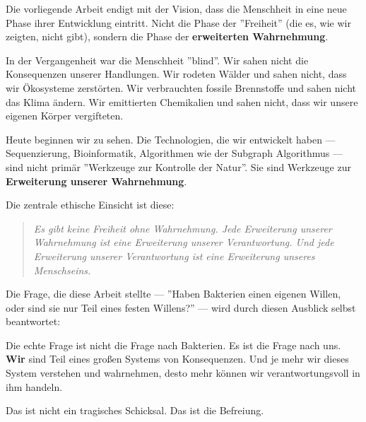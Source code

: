 \documentclass[a4paper,12pt]{article}
\theoremstyle{definition}
\begin{document}
Die vorliegende Arbeit endigt mit der Vision, dass die Menschheit in eine neue Phase ihrer Entwicklung eintritt. Nicht die Phase der ''Freiheit'' (die es, wie wir zeigten, nicht gibt), sondern die Phase der \textbf{erweiterten Wahrnehmung}.

In der Vergangenheit war die Menschheit ''blind''. Wir sahen nicht die Konsequenzen unserer Handlungen. Wir rodeten Wälder und sahen nicht, dass wir Ökosysteme zerstörten. Wir verbrauchten fossile Brennstoffe und sahen nicht das Klima ändern. Wir emittierten Chemikalien und sahen nicht, dass wir unsere eigenen Körper vergifteten.

Heute beginnen wir zu sehen. Die Technologien, die wir entwickelt haben --- Sequenzierung, Bioinformatik, Algorithmen wie der Subgraph Algorithmus --- sind nicht primär ''Werkzeuge zur Kontrolle der Natur''. Sie sind Werkzeuge zur \textbf{Erweiterung unserer Wahrnehmung}.

Die zentrale ethische Einsicht ist diese:

\begin{quote}
\textit{Es gibt keine Freiheit ohne Wahrnehmung. Jede Erweiterung unserer Wahrnehmung ist eine Erweiterung unserer Verantwortung. Und jede Erweiterung unserer Verantwortung ist eine Erweiterung unseres Menschseins.}
\end{quote}

Die Frage, die diese Arbeit stellte --- ''Haben Bakterien einen eigenen Willen, oder sind sie nur Teil eines festen Willens?'' --- wird durch diesen Ausblick selbst beantwortet:

Die echte Frage ist nicht die Frage nach Bakterien. Es ist die Frage nach uns. \textbf{Wir} sind Teil eines großen Systems von Konsequenzen. Und je mehr wir dieses System verstehen und wahrnehmen, desto mehr können wir verantwortungsvoll in ihm handeln.

Das ist nicht ein tragisches Schicksal. Das ist die Befreiung.
\end{document}
